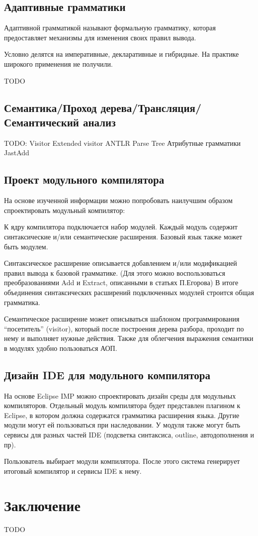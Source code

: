 \documentclass[a4paper,12pt]{article}
\begin{document}
\subsection{Адаптивные грамматики}
Адаптивной грамматикой называют формальную грамматику, которая предоставляет
механизмы для изменения своих правил вывода.

Условно делятся на императивные, декларативные и гибридные. На практике
широкого применения не получили.

TODO

\subsection{Семантика/Проход дерева/Трансляция/Семантический анализ}
TODO:
 Visitor
  Extended visitor
 ANTLR Parse Tree
 Атрибутные грамматики
  JastAdd

\subsection{Проект модульного компилятора}
На основе изученной информации можно попробовать наилучшим образом
спроектировать модульный компилятор:

К ядру компилятора подключается набор модулей. Каждый модуль содержит
синтаксические и/или семантические расширения. Базовый язык также может быть
модулем.

Синтаксическое расширение описывается добавлением и/или модификацией правил
вывода к базовой грамматике. (Для этого можно воспользоваться преобразованиями
Add и Extract, описанными в статьях П.Егорова\cite{Egor}) В итоге объединения
синтаксических расширений подключенных модулей строится общая грамматика.

Семантическое расширение может описываться шаблоном программирования
``посетитель'' (visitor), который после построения дерева разбора, проходит по
нему и выполняет нужные действия. Также для облегчения выражения семантики в
модулях удобно пользоваться АОП.

\subsection{Дизайн IDE для модульного компилятора}

На основе Eclipse IMP можно спроектировать дизайн среды для модульных
компиляторов.
Отдельный модуль компилятора будет представлен плагином к Eclipse, в котором
должна содержатся грамматика расширения языка. Другие модули могут ей
пользоваться при наследовании. У модуля также могут быть сервисы для разных
частей IDE (подсветка синтаксиса, outline, автодополнения и пр).

Пользователь выбирает модули компилятора. После этого система генерирует
итоговый компилятор и сервисы IDE к нему.

\section{Заключение}

TODO

\small
\nocite{*}

{}

\end{document}
